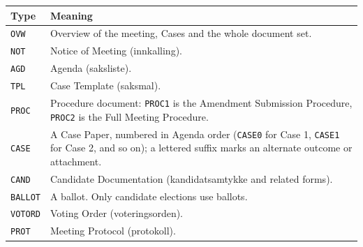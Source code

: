 \documentclass{../../../Common/Latex/Templates/rapport}
\begin{document}
\begin{longtable}{|L{2cm}|L{11.5cm}|}
  \hline
  \textbf{Type}   & \textbf{Meaning}                                                                                                                                                      \\
  \hline
  \endhead
  \texttt{OVW}    & Overview of the meeting, Cases and the whole document set.                                                                                                            \\
  \hline
  \texttt{NOT}    & Notice of Meeting (innkalling).                                                                                                                                       \\
  \hline
  \texttt{AGD}    & Agenda (saksliste).                                                                                                                                                   \\
  \hline
  \texttt{TPL}    & Case Template (saksmal).                                                                                                                                              \\
  \hline
  \texttt{PROC}   & Procedure document: \texttt{PROC1} is the Amendment Submission Procedure, \texttt{PROC2} is the Full Meeting Procedure.                                               \\
  \hline
  \texttt{CASE}   & A Case Paper, numbered in Agenda order (\texttt{CASE0} for Case 1, \texttt{CASE1} for Case 2, and so on); a lettered suffix marks an alternate outcome or attachment. \\
  \hline
  \texttt{CAND}   & Candidate Documentation (kandidatsamtykke and related forms).                                                                                                         \\
  \hline
  \texttt{BALLOT} & A ballot. Only candidate elections use ballots.                                                                                                                       \\
  \hline
  \texttt{VOTORD} & Voting Order (voteringsorden).                                                                                                                                        \\
  \hline
  \texttt{PROT}   & Meeting Protocol (protokoll).                                                                                                                                         \\

\end{longtable}
\end{document}

